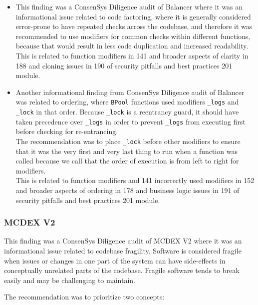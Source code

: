 \begin{itemize}
\item
  This finding was a ConsenSys Diligence audit of Balancer where it was
  an informational issue related to code factoring, where it is
  generally considered error-prone to have repeated checks across the
  codebase, and therefore it was recommended to use modifiers for common
  checks within different functions, because that would result in less
  code duplication and increased readability.\\

  This is related to function modifiers in 141 and broader aspects of
  clarity in 188 and cloning issues in 190 of security pitfalls and best
  practices 201 module.
\item
  Another informational finding from ConsenSys Diligence audit of
  Balancer was related to ordering, where \texttt{BPool} functions used
  modifiers \texttt{\_logs} and \texttt{\_lock} in that order. Because
  \texttt{\_lock} is a reentrancy guard, it should have taken precedence
  over \texttt{\_logs} in order to prevent \texttt{\_logs} from
  executing first before checking for re-entrancing.\\

  The recommendation was to place \texttt{\_lock} before other modifiers
  to ensure that it was the very first and very last thing to run when a
  function was called because we call that the order of execution is
  from left to right for modifiers.\\

  This is related to function modifiers and 141 incorrectly used
  modifiers in 152 and broader aspects of ordering in 178 and business
  logic issues in 191 of security pitfalls and best practices 201
  module.
\end{itemize}

\subsubsection{MCDEX V2}\label{mcdex-v2}

This finding was a ConsenSys Diligence audit of MCDEX V2 where it was an
informational issue related to codebase fragility. Software is
considered fragile when issues or changes in one part of the system can
have side-effects in conceptually unrelated parts of the codebase.
Fragile software tends to break easily and may be challenging to
maintain.

The recommendation was to prioritize two concepts:

